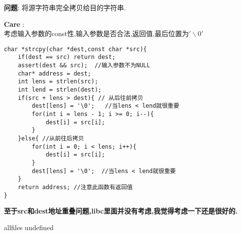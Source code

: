 \documentclass{article}
\begin{document}
\begin{CJK}{UTF8}{gbsn}     %

\else
    
\begin{description}
    \item{\textbf{问题}}: 将源字符串完全拷贝给目的字符串.
    \item{\textbf{Care}} : 
	\\考虑输入参数的const性,输入参数是否合法,返回值,最后位置为$'\backslash0'$
    \begin{lstlisting}
char *strcpy(char *dest,const char *src){
	if(dest == src)	return dest;
	assert(dest && src);  //输入参数不为NULL
	char* address = dest;
	int lens = strlen(src);
	int lend = strlen(dest);
	if(src + lens > dest){ // 从后往前拷贝
		dest[lens] = '\0';   //当lens < lend就很重要
		for(int i = lens - 1; i >= 0; i--){
			dest[i] = src[i];
		}
	}else{ //从前往后拷贝
		for(int i = 0; i < lens; i++){
			dest[i] = src[i];
		}
		dest[lens] = '\0';  //当lens < lend就很重要
	}
	return address; //注意此函数有返回值
}
    \end{lstlisting}
	\textbf{至于src和dest地址重叠问题,libc里面并没有考虑,我觉得考虑一下还是很好的.}
\end{description}

\fi

\ifx allfiles undefined
\end{CJK}
\end{document}
